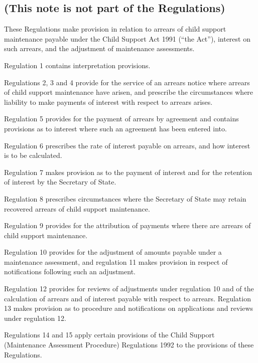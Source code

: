 \documentclass[12pt,a4paper]{article}
\begin{document}
\renewcommand\parthead{--- Explanatory Note}

\subsection*{(This note is not part of the Regulations)}

 These Regulations make provision in relation to arrears of child support maintenance payable under the Child Support Act 1991 (“the Act”), interest on such arrears, and the adjustment of maintenance assessments.

  Regulation 1 contains interpretation provisions.

  Regulations 2, 3 and 4 provide for the service of an arrears notice where arrears of child support maintenance have arisen, and prescribe the circumstances where liability to make payments of interest with respect to arrears arises.

  Regulation 5 provides for the payment of arrears by agreement and contains provisions as to interest where such an agreement has been entered into.

  Regulation 6 prescribes the rate of interest payable on arrears, and how interest is to be calculated.

  Regulation 7 makes provision as to the payment of interest and for the retention of interest by the Secretary of State.

  Regulation 8 prescribes circumstances where the Secretary of State may retain recovered arrears of child support maintenance.

  Regulation 9 provides for the attribution of payments where there are arrears of child support maintenance.

  Regulation 10 provides for the adjustment of amounts payable under a maintenance assessment, and regulation 11 makes provision in respect of notifications following such an adjustment.

  Regulation 12 provides for reviews of adjustments under regulation 10 and of the calculation of arrears and of interest payable with respect to arrears. Regulation 13 makes provision as to procedure and notifications on applications and reviews under regulation 12.

  Regulations 14 and 15 apply certain provisions of the Child Support (Maintenance Assessment Procedure) Regulations 1992 to the provisions of these Regulations.
\end{document}
